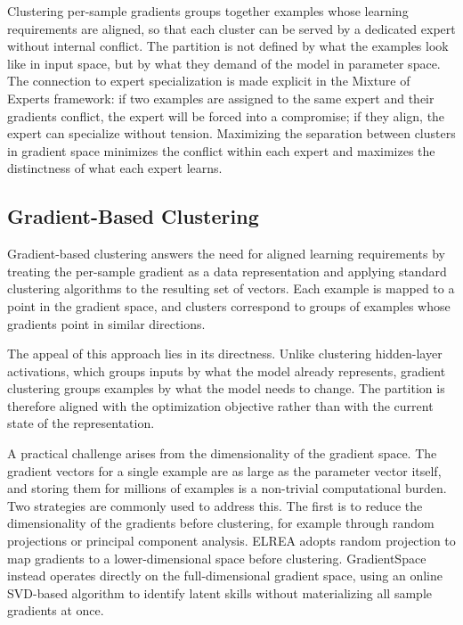 Clustering per-sample gradients groups together examples whose learning requirements are aligned, so that each cluster can be served by a dedicated expert without internal conflict. The partition is not defined by what the examples look like in input space, but by what they demand of the model in parameter space. The connection to expert specialization is made explicit in the Mixture of Experts framework: if two examples are assigned to the same expert and their gradients conflict, the expert will be forced into a compromise; if they align, the expert can specialize without tension. Maximizing the separation between clusters in gradient space minimizes the conflict within each expert and maximizes the distinctness of what each expert learns.

\subsection{Gradient-Based Clustering}
Gradient-based clustering answers the need for aligned learning requirements by treating the per-sample gradient as a data representation and applying standard clustering algorithms to the resulting set of vectors. Each example is mapped to a point in the gradient space, and clusters correspond to groups of examples whose gradients point in similar directions.

The appeal of this approach lies in its directness. Unlike clustering hidden-layer activations, which groups inputs by what the model already represents, gradient clustering groups examples by what the model needs to change. The partition is therefore aligned with the optimization objective rather than with the current state of the representation.

A practical challenge arises from the dimensionality of the gradient space. The gradient vectors for a single example are as large as the parameter vector itself, and storing them for millions of examples is a non-trivial computational burden. Two strategies are commonly used to address this. The first is to reduce the dimensionality of the gradients before clustering, for example through random projections or principal component analysis. ELREA adopts random projection to map gradients to a lower-dimensional space before clustering. GradientSpace instead operates directly on the full-dimensional gradient space, using an online SVD-based algorithm to identify latent skills without materializing all sample gradients at once. 

